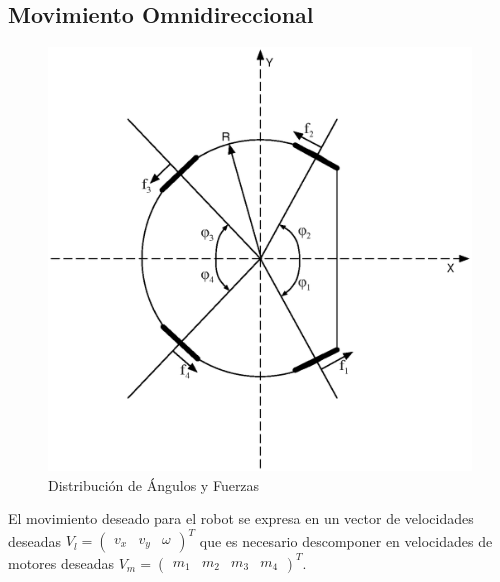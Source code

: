 \documentclass[twocolumn,10pt]{amrob}
\begin{document}
\subsection*{Movimiento Omnidireccional}
\begin{figure}
  \centering
    \includegraphics[scale=0.5]{anglesRobot.eps}
  \caption{Distribución de Ángulos y Fuerzas}
  \label{fig:angFzaDiag}
\end{figure}
El movimiento deseado para el robot se expresa en un vector de velocidades deseadas \( V_l= \begin{pmatrix} v_x & v_y & \omega \end{pmatrix}^{T} \) que es necesario descomponer en velocidades de motores deseadas \( V_m= \begin {pmatrix} m_1 & m_2 & m_3 & m_4 \end{pmatrix}^{T} \). 
\end{document}
